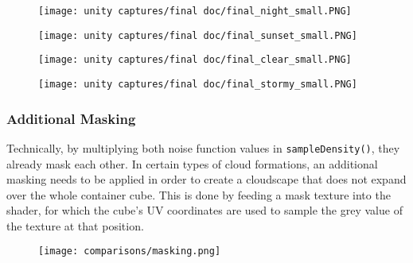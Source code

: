 \begin{figure}[H]
    \centering
        \begin{minipage}{0.47\linewidth}
            \texttt{[image: unity captures/final doc/final\_night\_small.PNG]}
            \label{img:captures:prototype_final:night}
        \end{minipage}
    \hfill
        \begin{minipage}{0.47\linewidth}
            \texttt{[image: unity captures/final doc/final\_sunset\_small.PNG]}
            \label{img:captures:prototype_final:sunset}
        \end{minipage}
\end{figure}

\begin{figure}[H]
    \centering
        \begin{minipage}{0.47\linewidth}
            \texttt{[image: unity captures/final doc/final\_clear\_small.PNG]}
            \label{img:captures:prototype_final:clear}
        \end{minipage}
    \hfill
        \begin{minipage}{0.47\linewidth}
            \texttt{[image: unity captures/final doc/final\_stormy\_small.PNG]}
            \label{img:captures:prototype_final:stormy}
        \end{minipage}
\end{figure}

\clearpage
\subsubsection{Additional Masking}
Technically, by multiplying both noise function values in \lstinline[language=HLSL]{sampleDensity()}, they already mask each other. In certain types of cloud formations, an additional masking needs to be applied in order to create a cloudscape that does not expand over the whole container cube.
This is done by feeding a mask texture into the shader, for which the cube's UV coordinates are used to sample the grey value of the texture at that position.

\begin{figure}[H]
    \centering
    \texttt{[image: comparisons/masking.png]}
    \label{img:camparisons:masking}
\end{figure}

